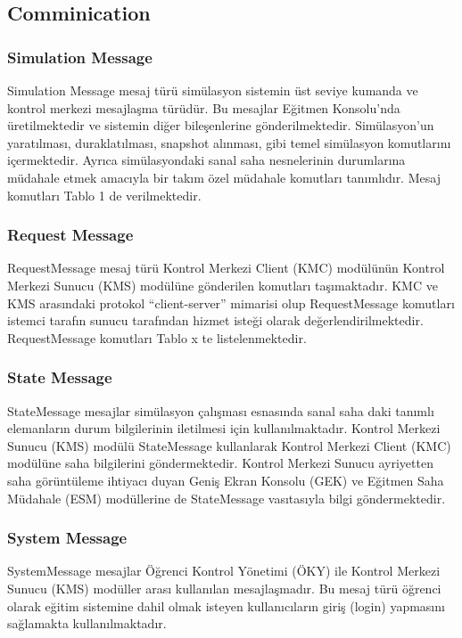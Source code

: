 \documentclass[conference]{IEEEtran}
\begin{document}
\subsection{Comminication}
\subsubsection{ Simulation Message}
Simulation Message mesaj türü simülasyon sistemin üst seviye kumanda ve kontrol merkezi mesajlaşma türüdür. Bu mesajlar Eğitmen Konsolu’nda üretilmektedir ve sistemin diğer bileşenlerine gönderilmektedir. Simülasyon’un yaratılması, duraklatılması, snapshot alınması, gibi temel simülasyon komutlarını içermektedir. Ayrıca simülasyondaki sanal saha nesnelerinin durumlarına müdahale etmek amacıyla bir takım özel müdahale komutları tanımlıdır. Mesaj komutları Tablo 1 de verilmektedir.
\subsubsection{Request Message}
RequestMessage mesaj türü Kontrol Merkezi Client (KMC) modülünün Kontrol Merkezi Sunucu (KMS) modülüne gönderilen komutları taşımaktadır. KMC ve KMS arasındaki protokol “client-server” mimarisi olup RequestMessage komutları istemci tarafın sunucu tarafından hizmet isteği olarak değerlendirilmektedir. RequestMessage komutları Tablo x te listelenmektedir.

\subsubsection{State Message}

StateMessage mesajlar simülasyon çalışması esnasında sanal saha daki tanımlı elemanların durum bilgilerinin iletilmesi için kullanılmaktadır. Kontrol Merkezi Sunucu (KMS) modülü StateMessage kullanlarak Kontrol Merkezi Client (KMC) modülüne saha bilgilerini göndermektedir. Kontrol Merkezi Sunucu ayriyetten saha görüntüleme ihtiyacı duyan Geniş Ekran Konsolu (GEK) ve Eğitmen Saha Müdahale (ESM) modüllerine de StateMessage vasıtasıyla bilgi göndermektedir.

\subsubsection{System Message}
SystemMessage mesajlar Öğrenci Kontrol Yönetimi (ÖKY) ile Kontrol Merkezi Sunucu (KMS) modüller arası kullanılan mesajlaşmadır. Bu mesaj türü öğrenci olarak eğitim sistemine dahil olmak isteyen kullanıcıların giriş (login) yapmasını sağlamakta kullanılmaktadır.
\end{document}
